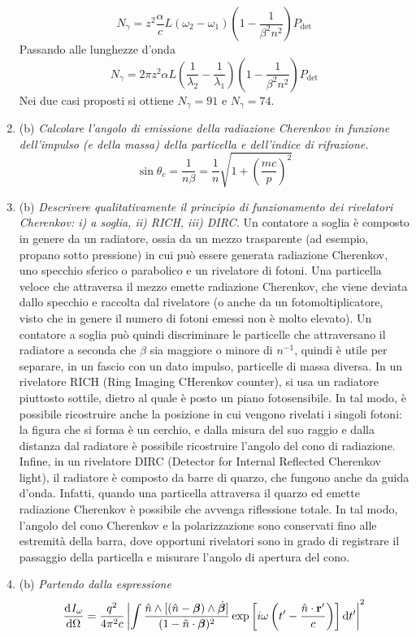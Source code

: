 \documentclass{article}
\renewcommand{\b}{(b)}
\renewcommand{\t}[1]{\textit{ #1}}
\renewcommand{\vec}[1]{\mathbf{#1}}
\begin{document}
\begin{enumerate}
	\[N_\gamma=z^2\frac{\alpha}{c}L(\omega_2-\omega_1)\left(1-\frac{1}{\beta^2n^2}\right)P_\textrm{det}\]
	Passando alle lunghezze d'onda
	\[N_\gamma=2\pi z^2\alpha L\left(\frac{1}{\lambda_2}-\frac{1}{\lambda_1}\right)\left(1-\frac{1}{\beta^2n^2}\right)P_\textrm{det}\]
	Nei due casi proposti si ottiene $N_\gamma=91$ e $N_\gamma=74$.
	\item\b\t{Calcolare l’angolo di emissione della radiazione Cherenkov in funzione
		dell’impulso (e della massa) della particella e dell’indice di rifrazione.}
	\[\sin\theta_c=\frac{1}{n\beta}=\frac{1}{n}\sqrt{1+\left(\frac{mc}{p}\right)^2}\]
	\item\b\t{Descrivere qualitativamente il principio di funzionamento dei rivelatori
		Cherenkov: i) a soglia, ii) RICH, iii) DIRC.} Un contatore a soglia è composto in genere da un radiatore, ossia da un mezzo trasparente (ad esempio, propano sotto pressione) in cui può essere generata radiazione Cherenkov, uno specchio sferico o parabolico e un rivelatore di fotoni. Una particella veloce che attraversa il mezzo emette radiazione Cherenkov, che viene deviata dallo specchio e raccolta dal rivelatore (o anche da un fotomoltiplicatore, visto che in genere il numero di fotoni emessi non è molto elevato). Un contatore a soglia può quindi discriminare le particelle che attraversano il radiatore a seconda che $\beta$ sia maggiore o minore di $n^{-1}$, quindi è utile per separare, in un fascio con un dato impulso, particelle di massa diversa. In un rivelatore RICH (Ring Imaging CHerenkov counter), si usa un radiatore piuttosto sottile, dietro al quale è posto un piano fotosensibile. In tal modo, è possibile ricostruire anche la posizione in cui vengono rivelati i singoli fotoni: la figura che si forma è un cerchio, e dalla misura del suo raggio e dalla distanza dal radiatore è possibile ricostruire l'angolo del cono di radiazione. Infine, in un rivelatore DIRC (Detector for Internal Reflected Cherenkov light), il radiatore è composto da barre di quarzo, che fungono anche da guida d'onda. Infatti, quando una particella attraversa il quarzo ed emette radiazione Cherenkov è possibile che avvenga riflessione totale. In tal modo, l'angolo del cono Cherenkov e la polarizzazione sono conservati fino alle estremità della barra, dove opportuni rivelatori sono in grado di registrare il passaggio della particella e misurare l'angolo di apertura del cono.
	\item\b\t{Partendo dalla espressione
		\[\der{I_\omega}{\Omega}=\frac{q^2}{4\pi^2c}\left|\int\frac{\hat{n}\wedge[(\hat{n}-\bm{\beta})\wedge\dot{\bm{\beta}}]}{(1-\hat{n}\cdot\bm{\beta})^2}\exp\left[i\omega\left(t'-\frac{\hat{n}\cdot\vec{r}'}{c}\right)\right]\d t'\right|^2\]
}
\end{enumerate}
\end{document}

